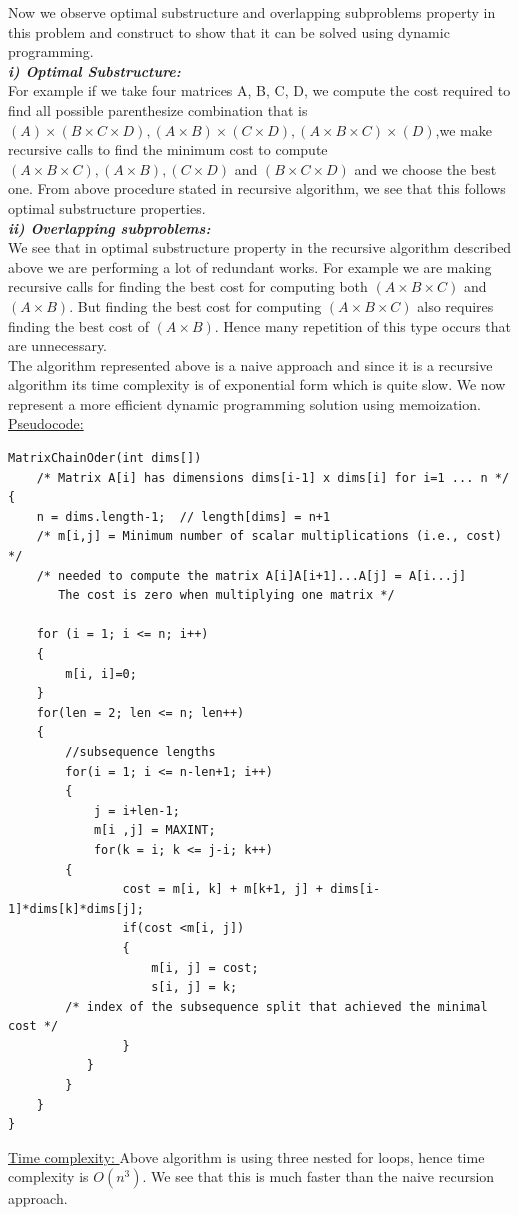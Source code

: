 \documentclass[12pt]{book}
\begin{document}
Now we observe optimal substructure and overlapping subproblems property in this problem and construct to show that it can be solved using dynamic programming.\\

\textbf{\textit{i) Optimal Substructure:}}\\
  For example if we take four matrices A, B, C, D, we compute the cost required to find all possible parenthesize combination that is $(A)\times (B\times C\times D), (A\times B)\times (C\times D), (A\times B\times C)\times (D)$,we make recursive calls to find the minimum cost to compute $(A\times B\times C), (A\times B) ,(C\times D)$ and $(B\times C\times D)$ and we choose the best one. From above procedure stated in recursive algorithm, we see that this follows optimal substructure properties.\\

\textbf{\textit{ii) Overlapping subproblems:}}\\
    We see that in optimal substructure property in the recursive algorithm described above we are performing a lot of redundant works. For example we are making recursive calls for finding the best cost for computing both $(A\times B\times C)$ and $(A\times B)$. But finding the best cost for computing $(A\times B\times C)$ also requires finding the best cost of $(A\times B)$. Hence many repetition of this type occurs that are unnecessary.\\
The algorithm represented above is a naive approach and since it is a recursive algorithm its time complexity is of exponential form which is quite slow. We now represent a more efficient dynamic programming solution using memoization.\\

\underline{Pseudocode:}\\
\begin{lstlisting}
MatrixChainOder(int dims[])
    /* Matrix A[i] has dimensions dims[i-1] x dims[i] for i=1 ... n */
{
	n = dims.length-1;  // length[dims] = n+1
    /* m[i,j] = Minimum number of scalar multiplications (i.e., cost) */
    /* needed to compute the matrix A[i]A[i+1]...A[j] = A[i...j]
       The cost is zero when multiplying one matrix */

    for (i = 1; i <= n; i++)
    {	
        m[i, i]=0;
    }
    for(len = 2; len <= n; len++)
    {
        //subsequence lengths
        for(i = 1; i <= n-len+1; i++)
        {
            j = i+len-1;
            m[i ,j] = MAXINT;
            for(k = i; k <= j-i; k++)
		{	
                cost = m[i, k] + m[k+1, j] + dims[i-1]*dims[k]*dims[j];
                if(cost <m[i, j])
                {
                    m[i, j] = cost;
                    s[i, j] = k;
        /* index of the subsequence split that achieved the minimal cost */
                }
           }
        }
    }
}
\end{lstlisting}
\underline{Time complexity: } Above algorithm is using three nested for loops, hence time complexity is $O(n^3)$. We see that this is much faster than the naive recursion approach.\\
\end{document}
